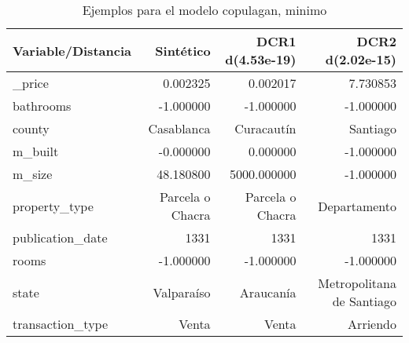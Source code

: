 \begin{table}[H]
\centering
\fontsize{10}{14}\selectfont
\caption{Ejemplos para el modelo copulagan, minimo}
\label{table-example-economicos-b-2-copulagan-min}
\begin{tabular}{|l|r|r|r|}
\hline
\rowcolor[gray]{0.8}
Variable/Distancia & Sintético & DCR1 d(4.53e-19) & DCR2 d(2.02e-15) \\
\hline \_price & \cellcolor[rgb]{0.9, 0.54, 0.52} 0.002325 & \cellcolor[rgb]{0.9, 0.54, 0.52} 0.002017 & 7.730853 \\
\hline bathrooms & \cellcolor[rgb]{0.9, 0.54, 0.52} -1.000000 & \cellcolor[rgb]{0.9, 0.54, 0.52} -1.000000 & \cellcolor[rgb]{0.9, 0.54, 0.52} -1.000000 \\
\hline county & \cellcolor[rgb]{0.9, 0.54, 0.52} Casablanca & Curacautín & Santiago \\
\hline m\_built & \cellcolor[rgb]{0.9, 0.54, 0.52} -0.000000 & \cellcolor[rgb]{0.9, 0.54, 0.52} 0.000000 & \cellcolor[rgb]{0.9, 0.54, 0.52} -1.000000 \\
\hline m\_size & \cellcolor[rgb]{0.9, 0.54, 0.52} 48.180800 & 5000.000000 & -1.000000 \\
\hline property\_type & \cellcolor[rgb]{0.9, 0.54, 0.52} Parcela o Chacra & \cellcolor[rgb]{0.9, 0.54, 0.52} Parcela o Chacra & Departamento \\
\hline publication\_date & \cellcolor[rgb]{0.9, 0.54, 0.52} 1331 & \cellcolor[rgb]{0.9, 0.54, 0.52} 1331 & \cellcolor[rgb]{0.9, 0.54, 0.52} 1331 \\
\hline rooms & \cellcolor[rgb]{0.9, 0.54, 0.52} -1.000000 & \cellcolor[rgb]{0.9, 0.54, 0.52} -1.000000 & \cellcolor[rgb]{0.9, 0.54, 0.52} -1.000000 \\
\hline state & \cellcolor[rgb]{0.9, 0.54, 0.52} Valparaíso & Araucanía & Metropolitana de Santiago \\
\hline transaction\_type & \cellcolor[rgb]{0.9, 0.54, 0.52} Venta & \cellcolor[rgb]{0.9, 0.54, 0.52} Venta & Arriendo \\
\hline
\end{tabular}
\end{table}
